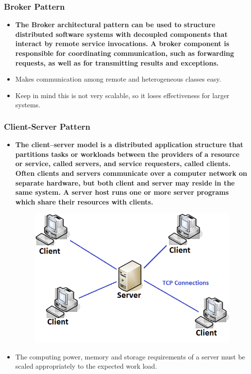 \documentclass[a4paper]{article}
\begin{document}
\subsubsection{Broker Pattern}
\begin{itemize}
\item \textbf{The Broker architectural pattern can be used to structure distributed software systems with decoupled components that interact by remote service invocations. A broker component is responsible for coordinating communication, such as forwarding requests, as well as for transmitting results and exceptions.}
\item Makes communication among remote and heterogeneous classes easy.
\item Keep in mind this is not very scalable, so it loses effectiveness for larger systems.
\end{itemize}

\subsubsection{Client-Server Pattern}
\begin{itemize}
\item \textbf{The client–server model is a distributed application structure that partitions tasks or workloads between the providers of a resource or service, called servers, and service requesters, called clients. Often clients and servers communicate over a computer network on separate hardware, but both client and server may reside in the same system. A server host runs one or more server programs which share their resources with clients.}

\begin{figure}[H]
\centering 
\includegraphics[scale=0.5]{images/client_server.png}
\end{figure}

\item The computing power, memory and storage requirements of a server must be scaled appropriately to the expected work load.

\end{itemize}
\end{document}
